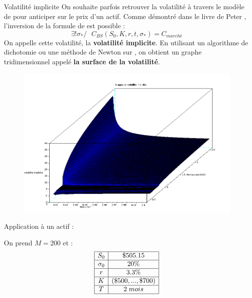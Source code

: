 \documentclass[final]{beamer}
\newlength{\onecolwid}
\begin{document}
\begin{frame}[t]
\begin{columns}[t]
\begin{column}{\onecolwid}
\begin{block}{Volatilité implicite}
On souhaite parfois retrouver la volatilité à travers le modèle de  pour anticiper sur le prix d'un actif. \newline
Comme démontré dans le livre de Peter , l'inversion de la formule de  est possible :
  $$ \exists ! \sigma_* / \ \ \ C_{BS}(S_0,K,r,t,\sigma_*) = C_{marché} $$
  On appelle cette volatilité, la \textbf{volatilité implicite}.
\newline
  En utilisant un algorithme de dichotomie ou une méthode de Newton sur , on obtient un graphe tridimensionnel appelé \textbf{la surface de la volatilité}.
    \begin{figure}
      \includegraphics[scale=0.80]{volimpl1.png}
      \label{Exemple de surface de volatilité}
    \end{figure}
\end{block}

\begin{block}{Application à un actif :}
  \begin{minipage}{0.49\textwidth}
    On prend $M = 200$ et :
      \[
        \begin{array}{|c|c|}
          \hline
          S_0 & \$ 505.15  \\ \hline
          \sigma_0 & 20\% \\ \hline
          r & 3.3 \% \\ \hline
          K & (\$500,...,\$700) \\ \hline
          T & 2 \;mois \\ \hline
        \end{array}
      \]
  \end{minipage}


\end{block}
\end{column}
\end{columns}
\end{frame}
\end{document}
